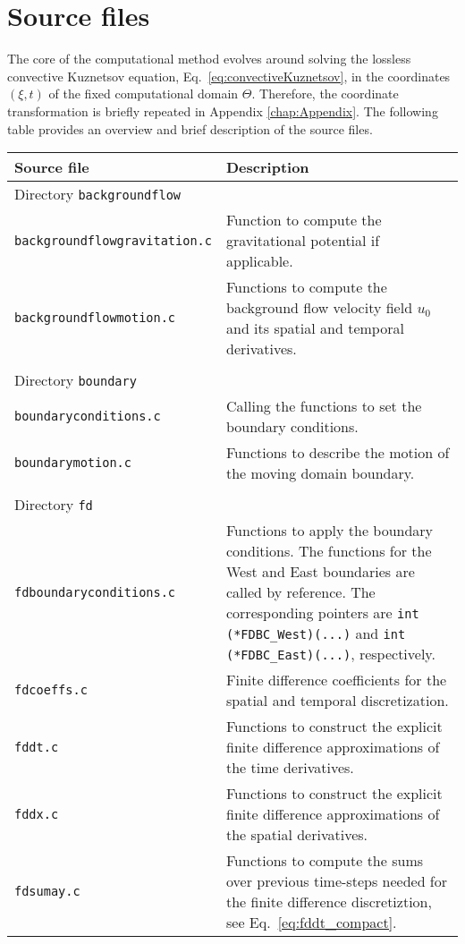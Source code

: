 \section{Source files}
\label{sec:Source files}

The core of the computational method evolves around solving the lossless convective Kuznetsov equation, Eq.~\eqref{eq:convectiveKuznetsov}, in the coordinates $\left(\xi,t\right)$ of the fixed computational domain $\Theta$. Therefore, the coordinate transformation is briefly repeated in Appendix \ref{chap:Appendix}. The following table provides an overview and brief description of the source files.

\noindent
\begin{longtable}{p{} p{}}
\textbf{Source file} & \textbf{Description}
\vspace{1mm} \\
\hline Directory {\tt backgroundflow} &\\ \hline
{\tt backgroundflowgravitation.c} & Function to compute the gravitational potential if applicable. \\
{\tt backgroundflowmotion.c} & Functions to compute the background flow velocity field $u_0$ and its spatial and temporal derivatives. \\
\\
\hline Directory {\tt boundary} &\\ \hline
{\tt boundaryconditions.c} & Calling the functions to set the boundary conditions. \\
{\tt boundarymotion.c} & Functions to describe the motion of the moving domain boundary. \\
\\
\hline Directory {\tt fd} &\\ \hline
{\tt fdboundaryconditions.c} & Functions to apply the boundary conditions. The functions for the West and East boundaries are called by reference. The corresponding pointers are {\tt int (*FDBC\_West)(...)} and {\tt int (*FDBC\_East)(...)}, respectively.  \\
{\tt fdcoeffs.c} & Finite difference coefficients for the spatial and temporal discretization. \\
{\tt fddt.c} & Functions to construct the explicit finite difference approximations of the time derivatives. \\
{\tt fddx.c} & Functions to construct the explicit finite difference approximations of the spatial derivatives.  \\
{\tt fdsumay.c} & Functions to compute the sums over previous time-steps needed for the finite difference discretiztion, see Eq.~\eqref{eq:fddt_compact}. \\

\end{longtable}

